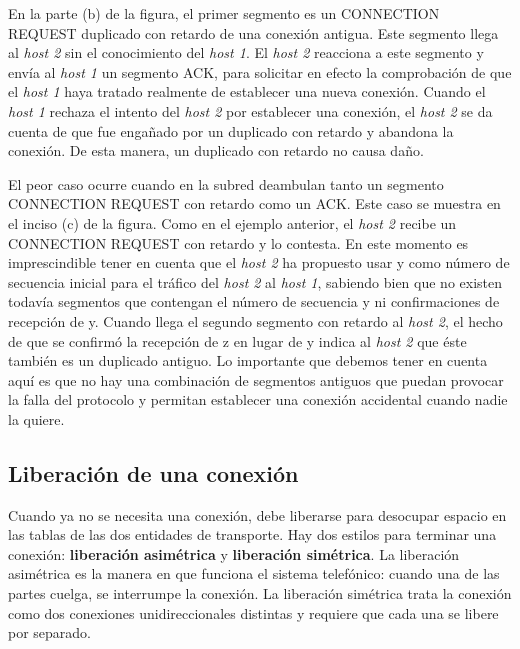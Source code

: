 \documentclass[10pt,a4paper]{report}
\begin{document}
		\par En la parte (b) de la figura, el primer segmento es un CONNECTION REQUEST duplicado con retardo de una conexión antigua. Este segmento llega al \textit{host 2} sin el conocimiento del \textit{host 1}. El \textit{host 2} reacciona a este segmento y envía al \textit{host 1} un segmento ACK, para solicitar en efecto la comprobación de que el \textit{host 1} haya tratado realmente de establecer una nueva conexión. Cuando el \textit{host 1} rechaza el intento del \textit{host 2} por establecer una conexión, el \textit{host 2} se da cuenta de que fue engañado por un duplicado con retardo y abandona la conexión. De esta manera, un duplicado con retardo no causa daño.

		\par El peor caso ocurre cuando en la subred deambulan tanto un segmento CONNECTION REQUEST con retardo como un ACK. Este caso se muestra en el inciso (c) de la figura. Como en el ejemplo anterior, el \textit{host 2} recibe un CONNECTION REQUEST con retardo y lo contesta. En este momento es imprescindible tener en cuenta que el \textit{host 2} ha propuesto usar y como número de secuencia inicial para el tráfico del \textit{host 2} al \textit{host 1}, sabiendo bien que no existen todavía segmentos que contengan el número de secuencia y ni confirmaciones de recepción de y. Cuando llega el segundo segmento con retardo al \textit{host 2}, el hecho de que se confirmó la recepción de z en lugar de y indica al \textit{host 2} que éste también es un duplicado antiguo. Lo importante que debemos tener en cuenta aquí es que no hay una combinación de segmentos antiguos que puedan provocar la falla del protocolo y permitan establecer una conexión accidental cuando nadie la quiere.

\subsection{Liberación de una conexión}

	\par Cuando ya no se necesita una conexión, debe liberarse para desocupar espacio en las tablas de las dos entidades de transporte. Hay dos estilos para terminar una conexión: \textbf{liberación asimétrica} y \textbf{liberación simétrica}. La liberación asimétrica es la manera en que funciona el sistema telefónico: cuando una de las partes cuelga, se interrumpe la conexión. La liberación simétrica trata la conexión como dos conexiones unidireccionales distintas y requiere que cada una se libere por separado.
\end{document}
